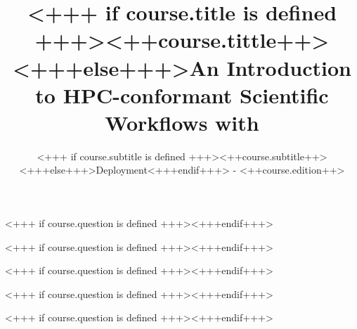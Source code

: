 \documentclass[english,xcolor=pdftex,dvipsnames,aspectratio=<+++ if course.aspectratio is defined +++><++course.aspectratio++><+++else+++>43<+++endif+++>]{beamer}
\title[<++course.shorttitle++>]{<+++ if course.title is defined +++><++course.tittle++><+++else+++>An Introduction to HPC-conformant Scientific Workflows with \Snakemake<+++endif+++>}
\subtitle{<+++ if course.subtitle is defined +++><++course.subtitle++><+++else+++>Deployment<+++endif+++> - <++course.edition++>}
\begin{document}

\sloppy

\begin{frame}[plain] %
  \titlepage
\end{frame}












<+++ if course.question is defined +++><+++endif+++>


<+++ if course.question is defined +++><+++endif+++>

% 


<+++ if course.question is defined +++><+++endif+++>


<+++ if course.question is defined +++><+++endif+++>


<+++ if course.question is defined +++><+++endif+++>
\end{document}
